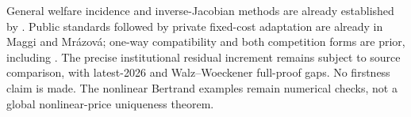 General welfare incidence and inverse-Jacobian methods are already
established by \citet{r19WeylFabinger2013,r19AdachiFabinger2022}. Public standards
followed by private fixed-cost adaptation are already in Maggi and
Mr\'azov\'a; one-way compatibility and both competition forms are prior, including \citet{r19BuccellaEtAl2026}.
The precise institutional residual increment remains subject to source
comparison, with latest-2026 and Walz--Woeckener full-proof gaps. No
firstness claim is made. The nonlinear Bertrand examples remain numerical
checks, not a global nonlinear-price uniqueness theorem.
